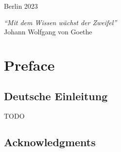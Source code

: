 \documentclass[12pt,a4paper]{book}
\theoremstyle{theorem}
\theoremstyle{definition}
\theoremstyle{remark}
\begin{document}
\vspace{2cm}
\begin{center}
	{\large Berlin 2023}
\end{center}


\cleardoublepage

\vspace*{6cm}

\begin{center}

{\large\emph{``Mit dem Wissen wächst der Zweifel''}}\\
\bigskip
Johann Wolfgang von Goethe
\end{center}

\cleardoublepage



\chapter*{Preface}



\section*{Deutsche Einleitung}

TODO %

\newpage
\section*{Acknowledgments}
\end{document}
